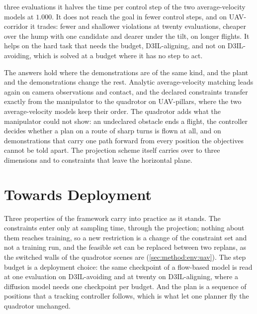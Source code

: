 \begin{description}
    three evaluations it halves the time per control step of the two average-velocity models at
    $1.000$. It does not reach the goal in fewer control steps, and on UAV-corridor it trades: fewer
    and shallower violations at twenty evaluations, cheaper over the hump with one candidate and
    dearer under the tilt, on longer flights. It helps on the hard task that needs the budget,
    D3IL-aligning, and not on D3IL-avoiding, which is solved at a budget where it has no step to act.
  \item[RQ3 --- Transfer.] The answers hold where the demonstrations are of the same kind, and the
    plant and the demonstrations change the rest. Analytic average-velocity matching leads again on
    camera observations and contact, and the declared constraints transfer exactly from the
    manipulator to the quadrotor on UAV-pillars, where the two average-velocity models keep their
    order. The quadrotor adds what the manipulator could not show: an undeclared obstacle ends a
    flight, the controller decides whether a plan on a route of sharp turns is flown at all, and on
    demonstrations that carry one path forward from every position the objectives cannot be told
    apart. The projection scheme itself carries over to three dimensions and to constraints that leave
    the horizontal plane.
\end{description}

\section{Towards Deployment}\label{sec:conc:practice}

Three properties of the framework carry into practice as it stands. The constraints enter only at
sampling time, through the projection; nothing about them reaches training, so a new restriction is a
change of the constraint set and not a training run, and the feasible set can be replaced between two
replans, as the switched walls of the quadrotor scenes are (\autoref{sec:method:env:uav}). The step
budget is a deployment choice: the same checkpoint of a flow-based model is read at one evaluation on
D3IL-avoiding and at twenty on D3IL-aligning, where a diffusion model needs one checkpoint per budget.
And the plan is a sequence of positions that a tracking controller follows, which is what let one
planner fly the quadrotor unchanged.


